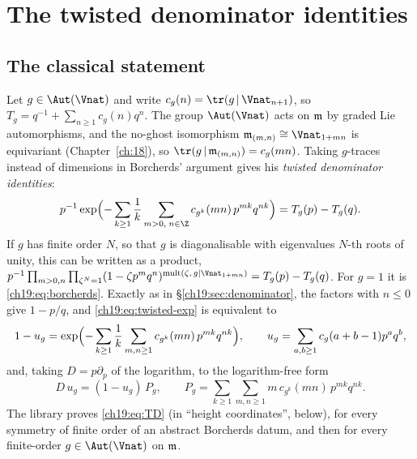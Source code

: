 \section{The twisted denominator identities}\label{ch19:sec:twisted}

\subsection{The classical statement}

Let $g\in\Aut(\Vnat)$ and write $c_g(n)=\tr(g\,|\,\Vnat_{n+1})$, so $T_g=q^{-1}+\sum_{n\ge1}c_g(n)q^n$.  The group $\Aut(\Vnat)$
acts on $\mathfrak{m}$ by graded Lie automorphisms, and the no-ghost isomorphism $\chnineteenm_{(m,n)}\cong\Vnat_{1+mn}$ is
equivariant (Chapter~\ref{ch:18}), so $\tr(g\,|\,\chnineteenm_{(m,n)})=c_g(mn)$.  Taking $g$-traces instead of dimensions in
Borcherds' argument gives his \emph{twisted denominator identities}:
\begin{equation}\label{ch19:eq:twisted-exp}
  p^{-1}\exp\Bigl(-\sum_{k\ge1}\frac1k\sum_{m>0,\;n\in\Z}c_{g^k}(mn)\,p^{mk}q^{nk}\Bigr)=T_g(p)-T_g(q) .
\end{equation}
If $g$ has finite order $N$, so that $g$ is diagonalisable with eigenvalues $N$-th roots of unity, this can be written as a
product, $p^{-1}\prod_{m>0,n}\prod_{\zeta^N=1}(1-\zeta p^mq^n)^{\mathrm{mult}(\zeta,\,g|\Vnat_{1+mn})}=T_g(p)-T_g(q)$.  For $g=1$
it is \eqref{ch19:eq:borcherds}.  Exactly as in \S\ref{ch19:sec:denominator}, the factors with $n\le0$ give $1-p/q$, and
\eqref{ch19:eq:twisted-exp} is equivalent to
\begin{equation}\label{ch19:eq:twisted-u}
  1-u_g=\exp\Bigl(-\sum_{k\ge1}\frac1k\sum_{m,n\ge1}c_{g^k}(mn)\,p^{mk}q^{nk}\Bigr),\qquad u_g=\sum_{a,b\ge1}c_g(a+b-1)p^aq^b,
\end{equation}
and, taking $D=p\partial_p$ of the logarithm, to the logarithm-free form
\begin{equation}\label{ch19:eq:TD}
  D\,u_g=(1-u_g)\,P_g,\qquad P_g=\sum_{k\ge1}\sum_{m,n\ge1}m\,c_{g^k}(mn)\,p^{mk}q^{nk}.\tag{TD$_g$}
\end{equation}
The library proves \eqref{ch19:eq:TD} (in ``height coordinates'', below), for every symmetry of finite order of an
abstract Borcherds datum, and then for every finite-order $g\in\Aut(\Vnat)$ on $\mathfrak{m}$.


